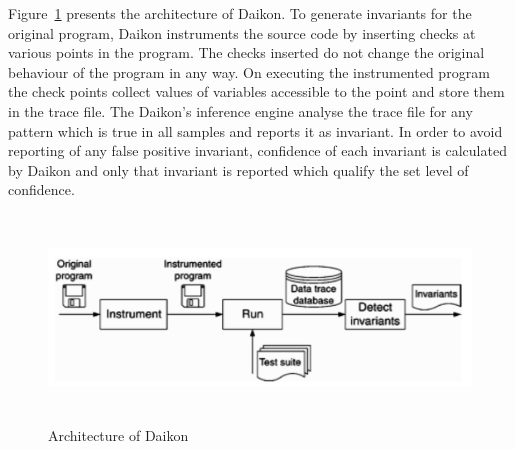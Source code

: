 Figure~\ref{fig:daikon} presents the architecture of Daikon. To generate invariants for the original program, Daikon instruments the source code by inserting checks at various points in the program. The checks inserted do not change the original behaviour of the program in any way. On executing the instrumented program the check points collect values of variables accessible to the point and store them in the trace file. The Daikon's inference engine analyse the trace file for any pattern which is true in all samples and reports it as invariant. In order to avoid reporting of any false positive invariant, confidence of each invariant is calculated by Daikon and only that invariant is reported which qualify the set level of confidence. 

\bigskip
\begin{figure}[H]
\centering
\includegraphics[width= 15.5cm,height=5.5cm]{chapter7/daikon.png}
\bigskip
\caption{Architecture of Daikon~\cite{ernst2001dynamically}}
\label{fig:daikon}
\end{figure}
\bigskip


